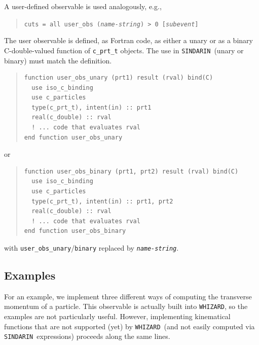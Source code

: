 \documentclass[12pt]{book}
\newcommand{\ttt}[1]{\texttt{#1}}
\newcommand{\whizard}{\texttt{WHIZARD}}
\newcommand{\sindarin}{\texttt{SINDARIN}}
\begin{document}
A user-defined observable is used analogously, e.g.,
\begin{quote}
\begin{footnotesize}
  \ttt{cuts = all user\_obs (\emph{name-string}) > 0 [\emph{subevent}]}
\end{footnotesize}
\end{quote}
The user observable is defined, as Fortran code, as either a unary or
as a binary C-double-valued function of \ttt{c\_prt\_t} objects.  The
use in \sindarin\ (unary or binary) must match the definition.
\begin{quote}
\begin{footnotesize}
\begin{verbatim}
function user_obs_unary (prt1) result (rval) bind(C)
  use iso_c_binding
  use c_particles
  type(c_prt_t), intent(in) :: prt1
  real(c_double) :: rval
  ! ... code that evaluates rval
end function user_obs_unary
\end{verbatim}
\end{footnotesize}
\end{quote}
or
\begin{quote}
\begin{footnotesize}
\begin{verbatim}
function user_obs_binary (prt1, prt2) result (rval) bind(C)
  use iso_c_binding
  use c_particles
  type(c_prt_t), intent(in) :: prt1, prt2
  real(c_double) :: rval
  ! ... code that evaluates rval
end function user_obs_binary
\end{verbatim}
\end{footnotesize}
\end{quote}
with \ttt{user\_obs\_unary}/\ttt{binary} replaced by
\ttt{\emph{name-string}}.

\subsection{Examples}

For an example, we implement three different ways of computing the
transverse momentum of a particle.  This observable is actually
built into \whizard, so the examples are not particularly useful.  However,
implementing kinematical functions that are not supported (yet) by
\whizard\ (and not easily computed via \sindarin\ expressions)
proceeds along the same lines.
\end{document}
